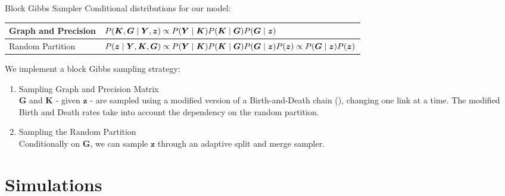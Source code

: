 \begin{frame}{Block Gibbs Sampler}
    Conditional distributions for our model:
    \begin{table}[tb]
        \centering
        \begin{tabular}{ll}
        \toprule
        Graph and Precision & $\small P(\bm{K},\bm{G} \mid \bm{Y},\bm{z}) \propto P(\bm{Y} \mid \bm{K})P(\bm{K} \mid \bm{G}) P(\bm{G} \mid \bm{z})$ \\
        \hline
        Random Partition & $\small P(\bm{z} \mid \bm{Y},\bm{K},\bm{G}) \propto P(\bm{Y} \mid \bm{K})P(\bm{K} \mid \bm{G})P(\bm{G} \mid \bm{z})P(\bm{z}) \propto P(\bm{G} \mid \bm{z})P(\bm{z}) $ \\
        \bottomrule
        \end{tabular}
    \end{table}

    \pause 

    We implement a block Gibbs sampling strategy:
    \begin{enumerate}
        \item \alert{Sampling Graph and Precision Matrix}\\
        $\bm{G}$ and $\bm{K}$ - given $\bm{z}$ - are sampled using a modified version of a Birth-and-Death chain (\cite{mohammadiBayesianStructureLearning2015a}), changing one link at a time. The modified Birth and Death rates take into account the dependency on the random partition.
        \item \alert{Sampling the Random Partition}\\
        Conditionally on $\bm{G}$, we can sample $\bm{z}$ through an adaptive split and merge sampler. \textcolor{white}{changepoints everywhere}
    \end{enumerate}
\end{frame}


\section{Simulations}

